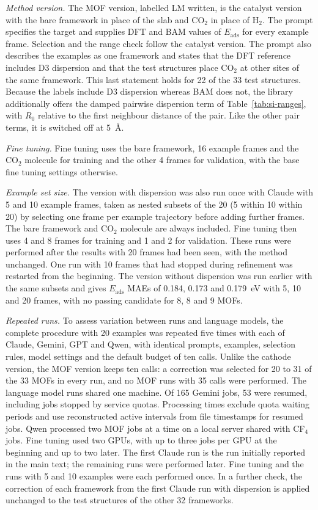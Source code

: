 \textit{Method version.} The MOF version, labelled LM written, is the catalyst version with the bare framework in place of the slab and CO$_2$ in place of H$_2$. The prompt specifies the target and supplies DFT and BAM values of $E_\mathrm{ads}$ for every example frame. Selection and the range check follow the catalyst version. The prompt also describes the examples as one framework and states that the DFT reference includes D3 dispersion and that the test structures place CO$_2$ at other sites of the same framework. This last statement holds for 22 of the 33 test structures. Because the labels include D3 dispersion whereas BAM does not, the library additionally offers the damped pairwise dispersion term of Table~\ref{tab:si-ranges}, with $R_0$ relative to the first neighbour distance of the pair. Like the other pair terms, it is switched off at 5~\AA.

\textit{Fine tuning.} Fine tuning uses the bare framework, 16 example frames and the CO$_2$ molecule for training and the other 4 frames for validation, with the base fine tuning settings otherwise.

\textit{Example set size.} The version with dispersion was also run once with Claude with 5 and 10 example frames, taken as nested subsets of the 20 (5 within 10 within 20) by selecting one frame per example trajectory before adding further frames. The bare framework and CO$_2$ molecule are always included. Fine tuning then uses 4 and 8 frames for training and 1 and 2 for validation. These runs were performed after the results with 20 frames had been seen, with the method unchanged. One run with 10 frames that had stopped during refinement was restarted from the beginning. The version without dispersion was run earlier with the same subsets and gives $E_\mathrm{ads}$ MAEs of 0.184, 0.173 and 0.179~eV with 5, 10 and 20 frames, with no passing candidate for 8, 8 and 9 MOFs.

\textit{Repeated runs.} To assess variation between runs and language models, the complete procedure with 20 examples was repeated five times with each of Claude, Gemini, GPT and Qwen, with identical prompts, examples, selection rules, model settings and the default budget of ten calls. Unlike the cathode version, the MOF version keeps ten calls: a correction was selected for 20 to 31 of the 33 MOFs in every run, and no MOF runs with 35 calls were performed. The language model runs shared one machine. Of 165 Gemini jobs, 53 were resumed, including jobs stopped by service quotas. Processing times exclude quota waiting periods and use reconstructed active intervals from file timestamps for resumed jobs. Qwen processed two MOF jobs at a time on a local server shared with CF$_4$ jobs. Fine tuning used two GPUs, with up to three jobs per GPU at the beginning and up to two later. The first Claude run is the run initially reported in the main text; the remaining runs were performed later. Fine tuning and the runs with 5 and 10 examples were each performed once. In a further check, the correction of each framework from the first Claude run with dispersion is applied unchanged to the test structures of the other 32 frameworks.

